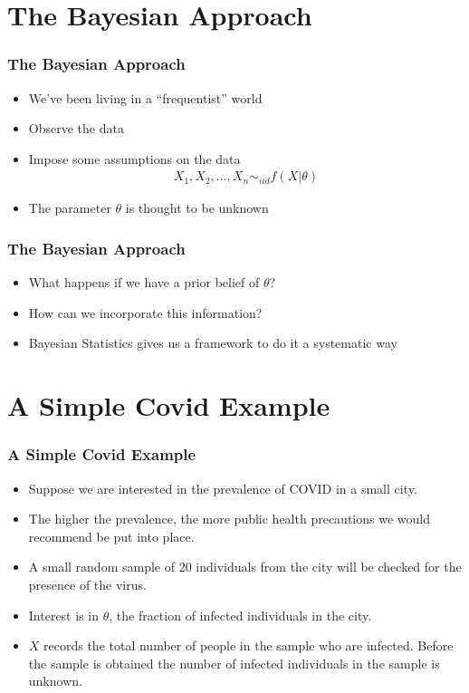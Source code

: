 \documentclass[
  shownotes,
  xcolor={svgnames},
  hyperref={colorlinks,citecolor=DarkBlue,linkcolor=DarkRed,urlcolor=DarkBlue}
  , aspectratio=169]{beamer}
\begin{document}
\section{The Bayesian Approach}
\begin{frame}[fragile]
\frametitle{The Bayesian Approach}

\begin{itemize}
\item We've been living in a ``frequentist'' world
\medskip
\item Observe the data
\medskip
\item Impose some assumptions on the data
\begin{align}
X_1,X_2,\dots,X_n \sim_{iid} f(X|\theta)
\end{align}
\medskip
\item The parameter $\theta$ is thought to be unknown
\end{itemize}
\end{frame}
\begin{frame}[fragile]
\frametitle{The Bayesian Approach}

\begin{itemize}
\item What happens if we have a prior belief of $\theta$?
\medskip
\item How can we incorporate this information?
\medskip
\item Bayesian Statistics gives us a framework to do it a systematic way

\end{itemize}


\end{frame}
\section{A Simple Covid Example}
\begin{frame}[fragile]
\frametitle{A Simple Covid Example}
\begin{itemize}
\item Suppose we are interested in the prevalence of COVID in a small city. 
\medskip
\item The higher the prevalence, the more public health precautions we would recommend be put into place. 
\medskip
\item A small random sample of 20 individuals from the city will be checked for the presence of the virus.
\medskip
\item Interest is in $\theta$, the fraction of infected individuals in the city. 
\medskip
\item $X$ records the total number of people in the sample who are infected. Before the sample is obtained the number of infected individuals in the sample is unknown.
\end{itemize}


\end{frame}
\end{document}
